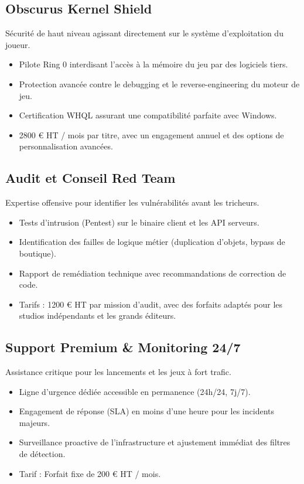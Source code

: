 \documentclass[12pt,a4paper]{article}
\begin{document}
\subsection{Obscurus Kernel Shield}
Sécurité de haut niveau agissant directement sur le système d'exploitation du joueur.
\begin{itemize}
    \item Pilote Ring 0 interdisant l'accès à la mémoire du jeu par des logiciels tiers.
    \item Protection avancée contre le debugging et le reverse-engineering du moteur de jeu.
    \item Certification WHQL assurant une compatibilité parfaite avec Windows.
    \item 2800 € HT / mois par titre, avec un engagement annuel et des options de personnalisation avancées.
\end{itemize}

\subsection{Audit et Conseil Red Team}
Expertise offensive pour identifier les vulnérabilités avant les tricheurs.
\begin{itemize}
    \item Tests d'intrusion (Pentest) sur le binaire client et les API serveurs.
    \item Identification des failles de logique métier (duplication d'objets, bypass de boutique).
    \item Rapport de remédiation technique avec recommandations de correction de code.
    \item Tarifs : 1200 € HT par mission d'audit, avec des forfaits adaptés pour les studios indépendants et les grands éditeurs.
\end{itemize}

\subsection{Support Premium \& Monitoring 24/7}
Assistance critique pour les lancements et les jeux à fort trafic.
\begin{itemize}
    \item Ligne d'urgence dédiée accessible en permanence (24h/24, 7j/7).
    \item Engagement de réponse (SLA) en moins d'une heure pour les incidents majeurs.
    \item Surveillance proactive de l'infrastructure et ajustement immédiat des filtres de détection.
    \item Tarif : Forfait fixe de 200 € HT / mois.
\end{itemize}
\end{document}
